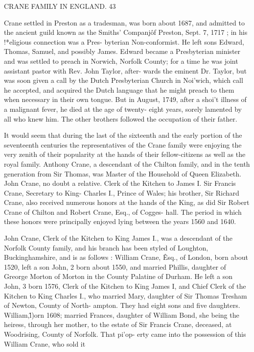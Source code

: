 CRANE FAMILY IN ENGLAND. 43 

Crane settled in Preston as a tradesman, was born about 1687, 
and admitted to the ancient guild known as the Smiths' Companj\^ 
of Preston, Sept. 7, 1717 ; in his !*eligious connection was a Pres- 
byterian Non-conformist. He left sons Edward, Thomas, Samuel, 
and possibly James. Edward became a Presbyterian minister 
and was settled to preach in Norwich, Norfolk County; for a 
time he was joint assistant pastor with Rev. John Taylor, after- 
wards the eminent Dr. Taylor, but was soon given a call by the 
Dutch Presbyterian Church in Noi'wich, which call he accepted, 
and acquired the Dutch language that he might preach to them 
when necessary in their own tongue. But in August, 1749, after 
a shoi't illness of a malignant fever, he died at the age of twenty- 
eight years, sorely lamented by all who knew him. The other 
brothers followed the occupation of their father. 

It would seem that during the last of the sixteenth and the 
early portion of the seventeenth centuries the representatives of 
the Crane family were enjoying the very zenith of their popularity 
at the hands of their fellow-citizens as well as the royal family. 
Anthony Crane, a descendant of the Chilton family, and in the 
tenth generation from Sir Thomas, was Master of the Household 
of Queen Elizabeth. John Crane, no doubt a relative. Clerk of 
the Kitchen to James I. Sir Francis Crane, Secretary to King- 
Charles I., Prince of Wales; his brother, Sir Richard Crane, 
also received numerous honors at the hands of the King, as did 
Sir Robert Crane of Chilton and Robert Crane, Esq., of Cogges- 
hall. The period in which these honors were principally enjoyed 
lying between the years 1560 and 1640. 

John Crane, Clerk of the Kitchen to King James I., was a 
descendant of the Norfolk County family, and his branch has 
been styled of Loughton, Buckinghamshire, and is as follows : 
William Crane, \^ Esq., of London, born about 1520, left a son 
John, 2 born about 1550, and married Phillis, daughter of Greorge 
Morton of Morton in the County Palatine of Durham. He left a 
son John, 3 born 1576, Clerk of the Kitchen to King James I, and 
Chief Clerk of the Kitchen to King Charles I., who married Mary, 
daughter of Sir Thomas Tresham of Newton, County of North- 
ampton. They had eight sons and five daughters. William,\^ 
l)orn 1608; married Frances, daughter of William Bond, she 
being the heiress, through her mother, to the estate of Sir Francis 
Crane, deceased, at Woodrising, County of Norfolk. That pi'op- 
erty came into the possession of this William Crane, who sold it 




